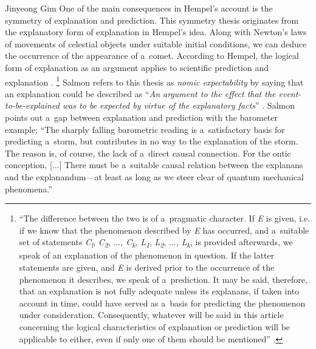 \begin{artengenv}{Jinyeong Gim}
One of the main consequences in Hempel's account is the symmetry of explanation and prediction. This symmetry thesis originates from the explanatory form of explanation in Hempel's idea. Along with Newton's laws of movements of celestial objects under suitable initial conditions, we can deduce the occurrence of the appearance of a~comet. According to Hempel, the logical form of explanation as an argument applies to scientific prediction and explanation
\parencites[][p.138]{hempel_studies_1948}[][p.249]{hempel_aspects_1965}.%
\footnote{``The difference between the two is of a~pragmatic character. If \textit{E} is given, i.e. if we know that the phenomenon described by \textit{E} has occurred, and a~suitable set of statements \textit{C}\textit{\textsubscript{l}}, \textit{C}\textit{\textsubscript{2}}, ...\textit{, C}\textit{\textsubscript{k}}, \textit{L}\textit{\textsubscript{1}}, \textit{L}\textit{\textsubscript{2}}, ...\textit{, L}\textit{\textsubscript{k}}, is provided afterwards, we speak of an explanation of the phenomenon in question. If the latter statements are given, and \textit{E} is derived prior to the occurrence of the phenomenon it describes, we speak of a~prediction. It may be said, therefore, that an explanation is not fully adequate unless its explanans, if taken into account in time, could have served as a~basis for predicting the phenomenon under consideration. Consequently, whatever will be said in this article concerning the logical characteristics of explanation or prediction will be applicable to either, even if only one of them should be mentioned'' 
\parencite[][p.138]{hempel_studies_1948}.%
} Salmon refers to this thesis as \textit{nomic expectability} by saying that an explanation could be described as ``\textit{An argument to the effect that the event-to-be-explained was to be expected by virtue of the explanatory facts}'' 
\parencite[][emphases original]{salmon_scientific_1984}. %
 Salmon 
\parencite*[][pp.129–130]{salmon_four_1989} %
 points out a~gap between explanation and prediction with the barometer example; ``The sharply falling barometric reading is a~satisfactory basis for predicting a~storm, but contributes in no way to the explanation of the storm. The reason is, of course, the lack of a~direct causal connection. For the ontic conception, [...] There must be a~suitable causal relation between the explanans and the explanandum---at least as long as we steer clear of quantum mechanical phenomena.''


\end{artengenv}
